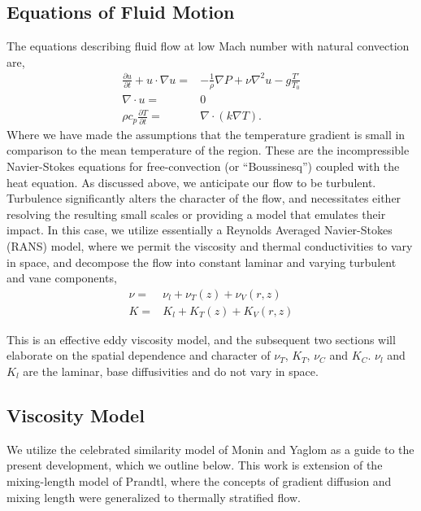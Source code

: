 \subsection{Equations of Fluid Motion}
%
%

The equations describing fluid flow at
low Mach number with natural convection are, 
\begin{eqnarray*}
 \frac{\partial u}{\partial t} + u \cdot \nabla u =&
  -\frac{1}{\rho}\nabla P + \nu \nabla^2 u - g \frac{T'}{T_0}\\
 \nabla \cdot u =& 0 \\
 \rho c_p \frac{\partial T}{\partial t} =& \nabla \cdot ( k \nabla T).
\end{eqnarray*} 
Where we have made the assumptions that the temperature gradient is small in
comparison to the mean temperature of the region. These are the
incompressible Navier-Stokes equations for free-convection (or
``Boussinesq'') coupled with the heat equation. 
%
%
%
As discussed above, we anticipate our flow to be
turbulent. Turbulence significantly alters the character of the flow,
and necessitates either resolving the resulting small scales or
providing a model that emulates their impact. In this case, we utilize 
essentially a Reynolds Averaged Navier-Stokes (RANS) model, where we
permit the viscosity and thermal conductivities to vary in space, and
decompose the flow into constant laminar and varying turbulent and vane
components,  
\begin{eqnarray*}
 \nu =& \nu_{l} + \nu_{T}(z) + \nu_{V}(r,z) \\
 K =& K_{l} + K_{T}(z) + K_{V}(r,z)
\end{eqnarray*}

This is an effective eddy viscosity model, and the subsequent two
sections will elaborate on the spatial dependence and character of
$\nu_T$, $K_T$, $\nu_C$ and $K_C$. $\nu_l$ and $K_l$ are the laminar,
base diffusivities and do not vary in space. 

\subsection{Viscosity Model}

We utilize the celebrated similarity model of Monin and
Yaglom\cite{monin2007statistical,monin1954basic} as a guide to the
present development, which we outline below. This work is extension of
the mixing-length model of Prandtl, where the concepts of gradient
diffusion and mixing length were generalized to thermally stratified
flow.   

